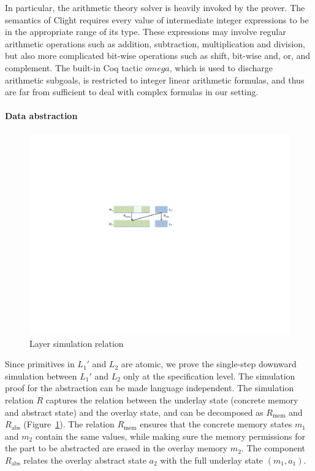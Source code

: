 In particular, the arithmetic theory solver is heavily invoked by the
prover. The semantics of Clight requires every value of intermediate
integer expressions to be in the appropriate range of its type. These
expressions may involve regular arithmetic operations such as
addition, subtraction, multiplication and division, but also more
complicated bit-wise operations such as shift, bit-wise and, or, and
complement. The built-in Coq tactic $omega$, which is used to
discharge arithmetic subgoals, is restricted to integer linear
arithmetic formulas, and thus are far from sufficient to deal with
complex formulas in our setting.


\paragraph{Data abstraction}
\begin{figure}[t]\centering
\includegraphics[scale=1]{figs/layersimulation}
\caption{Layer simulation relation}
\label{fig:layersimulation}
\hrulefill
    \afterpage{\FloatBarrier}
\end{figure}
Since primitives in $L_1'$ and $L_2$ are atomic, we prove the
single-step downward simulation between $L_1'$ and $L_2$ only at the
specification level.  The simulation proof for the abstraction can be
made language independent.  The simulation relation $R$ captures the
relation between the underlay state (concrete memory and abstract
state) and the overlay state, and can be decomposed as $R_\text{mem}$
and $R_\text{abs}$ (\cf Figure~\ref{fig:layersimulation}). The relation
$R_\text{mem}$ ensures that the concrete memory states $m_1$ and $m_2$
contain the same values, while making sure the memory permissions for
the part to be abstracted are erased in the overlay memory $m_2$.  The
component $R_\text{abs}$ relates the overlay abstract state $a_2$ with
the full underlay state $(m_1, a_1)$.

